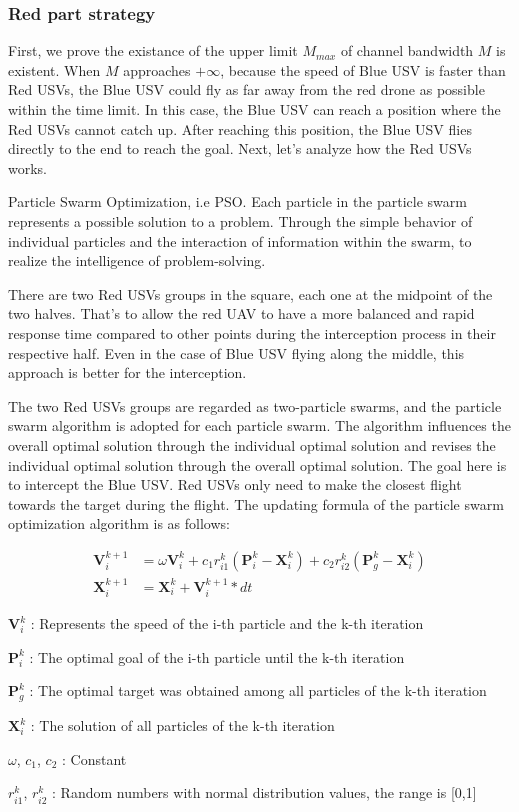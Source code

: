 \documentclass{mcmthesis}
\begin{document}
\subsubsection{Red part strategy}
First, we prove the existance of the upper limit $M_{max}$ of channel bandwidth $M$ is existent. When $M$ approaches $+ \infty$, because the speed of Blue USV is faster than Red USVs, the Blue USV could fly as far away from the red drone as possible within the time limit. In this case, the Blue USV can reach a position where the Red USVs cannot catch up. After reaching this position, the Blue USV flies directly to the end to reach the goal. Next, let's analyze how the Red USVs works. \par
Particle Swarm Optimization, i.e PSO. Each particle in the particle swarm represents a possible solution to a problem. Through the simple behavior of individual particles and the interaction of information within the swarm,  to realize the intelligence of problem-solving. \par
There are two Red USVs groups in the square, each one at the midpoint of the two halves. That's to allow the red UAV to have a more balanced and rapid response time compared to other points during the interception process in their respective half. Even in the case of Blue USV flying along the middle, this approach is better for the interception.\par
The two Red USVs groups are regarded as two-particle swarms, and the particle swarm algorithm is adopted for each particle swarm. The algorithm influences the overall optimal solution through the individual optimal solution and revises the individual optimal solution through the overall optimal solution. The goal here is to intercept the Blue USV. Red USVs only need to make the closest flight towards the target during the flight. The updating formula of the particle swarm optimization algorithm is as follows:

\begin{align}
\mathbf{V}_i^{k+1} & =\omega \mathbf{V}_i^k + c_1 r_{i1}^k (\mathbf{P}_i^k - \mathbf{X}_i^k) + c_2 r_{i2}^k (\mathbf{P}_g^k - \mathbf{X}_i^k) \\
\mathbf{X}_i^{k+1} & = \mathbf{X}_i^k + \mathbf{V}_i^{k+1} * dt
\end{align}

	$\mathbf{V}_i^k$ : Represents the speed of the i-th particle and the k-th iteration \par
    $\mathbf{P}_i^k$ : The optimal goal of the i-th particle until the k-th iteration \par
	$\mathbf{P}_g^k$ : The optimal target was obtained among all particles of the k-th iteration \par
	$\mathbf{X}_i^k$ : The solution of all particles of the k-th iteration \par
	$\omega$, $c_1$, $c_2$ : Constant \par
	$r_{i1}^k$, $r_{i2}^k$ : Random numbers with normal distribution values, the range is [0,1] \par
	
\end{document}
